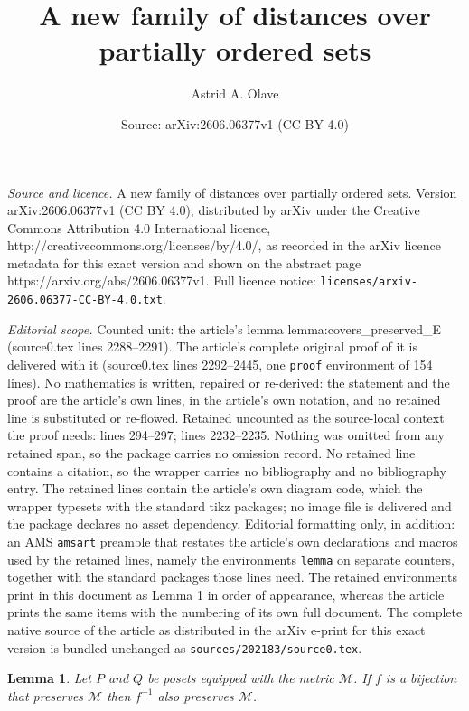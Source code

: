 \documentclass[10pt,a4paper]{amsart}
\title{A new family of distances over partially ordered sets}
\author{Astrid A. Olave}
\date{Source: arXiv:2606.06377v1 (CC BY 4.0)}
\newtheorem{lemma}{Lemma}
\begin{document}
\maketitle

\noindent\emph{Source and licence.} A new family of distances over partially ordered sets. Version arXiv:2606.06377v1 (CC BY 4.0), distributed by arXiv under the Creative Commons Attribution 4.0 International licence, http://creativecommons.org/licenses/by/4.0/, as recorded in the arXiv licence metadata for this exact version and shown on the abstract page https://arxiv.org/abs/2606.06377v1. Full licence notice: \texttt{licenses/arxiv-2606.06377-CC-BY-4.0.txt}.\par\smallskip

\noindent\textit{Editorial scope.} Counted unit: the article's lemma lemma:covers\_preserved\_E (source0.tex lines 2288--2291). The article's complete original proof of it is delivered with it (source0.tex lines 2292--2445, one \texttt{proof} environment of 154 lines). No mathematics is written, repaired or re-derived: the statement and the proof are the article's own lines, in the article's own notation, and no retained line is substituted or re-flowed.  Retained uncounted as the source-local context the proof needs: lines 294--297; lines 2232--2235.  Nothing was omitted from any retained span, so the package carries no omission record.  No retained line contains a citation, so the wrapper carries no bibliography and no bibliography entry.  The retained lines contain the article's own diagram code, which the wrapper typesets with the standard tikz packages; no image file is delivered and the package declares no asset dependency.  Editorial formatting only, in addition: an AMS \texttt{amsart} preamble that restates the article's own declarations and macros used by the retained lines, namely the environments \texttt{lemma} on separate counters, together with the standard packages those lines need.  The retained environments print in this document as Lemma 1 in order of appearance, whereas the article prints the same items with the numbering of its own full document.  The complete native source of the article as distributed in the arXiv e-print for this exact version is bundled unchanged as \texttt{sources/202183/source0.tex}.
\begin{lemma}
 Let $P$ and $Q$ be posets equipped with the metric $\mathcal{M}$. If $f$ is a bijection that preserves $\mathcal{M}$ then $f^{-1}$ also preserves $\mathcal{M}$.  
 \label{lemma_f-1_preserves}
\end{lemma}
\end{document}
